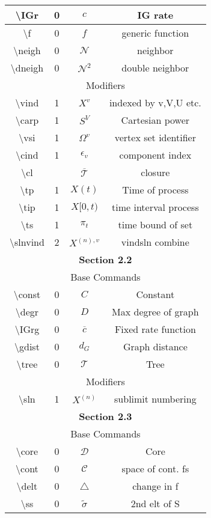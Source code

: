 \documentclass[12pt]{article}
\newcommand{\mc}{\mathcal}
\newcommand{\ov}{\overline}
\newcommand{\ep}{\epsilon}
\newcommand{\tbs}{\textbackslash}
\renewcommand{\v}{v}							%
\renewcommand{\S}{S}							%
\newcommand{\s}{\sigma}							%
\newcommand{\ev}{\ep}							%
\renewcommand{\t}{t}							%
\newcommand{\proj}{\pi}							%
\newcommand{\X}{X}								%
\newcommand{\IGr}{c}							%
\newcommand{\f}{f}								%
\newcommand{\neigh}{\mc{N}}						%
\newcommand{\dneigh}{\mc{N}^2}					%
\newcommand{\vind}[1]{^{#1}}					%
\newcommand{\carp}[1]{^{#1}}					%
\newcommand{\vsi}[1]{^{#1}}						%
\newcommand{\cind}[1]{_{#1}}					%
\newcommand{\cl}{\ov}							%
\newcommand{\tp}[1]{(#1)}						%
\newcommand{\tip}[1]{#1}						%
\newcommand{\ts}[1]{_{#1}}						%
\newcommand{\slnvind}[2]{^{(#1),#2}}				%
\newcommand{\const}{C}							%
\newcommand{\degr}{D}							%
\newcommand{\IGrg}{\ov{c}}						%
\newcommand{\gdist}{d_G}						%
\newcommand{\tree}{\mc{T}}						%
\newcommand{\sln}[1]{^{(#1)}}					%
\newcommand{\core}{\mc{D}}						%
\newcommand{\cont}{\mc{C}}						%
\newcommand{\delt}{\triangle}					%
\renewcommand{\ss}{\tilde{\s}}					%
\begin{document}
\begin{longtable}{|c|c|c|c|}
\tbs IGr & 0 & \(\IGr\) & IG rate\\\hline
\tbs f & 0 & \(\f\) & generic function\\\hline
\tbs neigh & 0 & \(\neigh\) & neighbor\\\hline
\tbs dneigh & 0 & \(\dneigh\) & double neighbor\\\hline
\multicolumn{4}{|c|}{Modifiers}\\\hline
\tbs vind & 1 & \(\X\vind{\v}\) & indexed by v,V,U etc.\\\hline
\tbs carp & 1 & \(\S\carp{V}\) & Cartesian power\\\hline
\tbs vsi & 1 & \(\Omega\vsi{\v}\) & vertex set identifier\\\hline
\tbs cind & 1 & \(\ev\cind{\v}\) & component index\\\hline
\tbs cl &  & \(\cl{\tree}\) & closure\\\hline
\tbs tp & 1 & \(\X\tp{\t}\) & Time of process\\\hline
\tbs tip & 1 & \(\X\tip{[0,\t)}\) & time interval process	\\\hline
\tbs ts & 1 & \(\proj\ts{\t}\) & time bound of set\\\hline
\tbs slnvind & 2 & \(\X\slnvind{n}{\v}\) & vindsln combine\\\hline
\multicolumn{4}{|c|}{\textbf{Section 2.2}}\\\hline
\multicolumn{4}{|c|}{Base Commands}\\\hline
\tbs const & 0 & \(\const\) & Constant\\\hline
\tbs degr & 0 & \(\degr\) & Max degree of graph\\\hline
\tbs IGrg & 0 & \(\IGrg\) & Fixed rate function\\\hline
\tbs gdist & 0 & \(\gdist\) & Graph distance\\\hline
\tbs tree & 0 & \(\tree\) & Tree\\\hline
\multicolumn{4}{|c|}{Modifiers}\\\hline
\tbs sln & 1 & \(\X\sln{n}\) & sublimit numbering\\\hline
\multicolumn{4}{|c|}{\textbf{Section 2.3}}\\\hline
\multicolumn{4}{|c|}{Base Commands}\\\hline
\tbs core & 0 & \(\core\) & Core\\\hline
\tbs cont & 0 & \(\cont\) & space of cont. fs\\\hline
\tbs delt & 0 & \(\delt\) & change in f\\\hline
\tbs ss & 0 & \(\ss\) & 2nd elt of \S\\\hline

\end{longtable}
\end{document}
